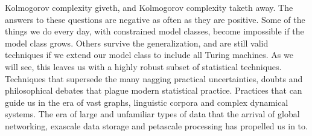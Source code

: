 Kolmogorov complexity giveth, and Kolmogorov complexity taketh away. The answers to these questions are negative as often as they are positive. Some of the things we do every day, with constrained model classes, become impossible if the model class grows. Others survive the generalization, and are still valid techniques if we extend our model class to include all Turing machines. As we will see, this leaves us with a highly robust subset of statistical techniques. Techniques that supersede the many nagging practical uncertainties, doubts and philosophical debates that plague modern statistical practice. Practices that can guide us in the era of vast graphs, linguistic corpora and complex dynamical systems. The era of large and unfamiliar types of data that the arrival of global networking, exascale data storage and petascale processing has propelled us in to.


